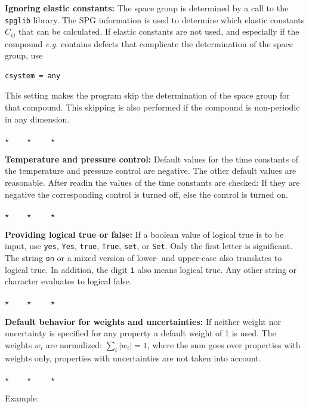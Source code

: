 \documentclass[a4paper,12pt,pdftex,onecolumn]{article}
\newcommand{\eg}{\emph{e.g.}\xspace}
\newcommand{\stars}{\begin{center}%
\vspace{1em plus 0.5em minus 0.5em}%
$\star \qquad \star \qquad \star$%
\vspace{1em plus 0.5em minus 0.5em}%
\end{center}}
\begin{document}
\textbf{Ignoring elastic constants:}
The space group is determined by a call to the \verb+spglib+ library.
The SPG information is used to determine which elastic constants $C_{ij}$ that can be
calculated. If elastic constants are not used, and especially if the compound \eg
contains defects that complicate the determination of the space group, use

\begin{Verbatim}[fontsize=\relsize{-1},frame=single]
csystem = any
\end{Verbatim}

This setting makes the program skip the determination of the space group for that
compound. This skipping is also performed if the compound is non-periodic in any
dimension.


\stars

\textbf{Temperature and pressure control:}
Default values for the time constants of the temperature and pressure control are negative.
The other default values are reasonable.
After readin the values of the time constants are checked: If they are negative the
corresponding control is turned off, else the control is turned on.


\stars

\textbf{Providing logical true or false:}
If a boolean value of logical true is to be input, use
\verb+yes+, \verb+Yes+, \verb+true+, \verb+True+, \verb+set+, or \verb+Set+.
Only the first letter is significant. The string \verb+on+
or a mixed version of lower- and upper-case also translates to logical true.
In addition, the digit \verb+1+ also means logical true.
Any other string or character evaluates to logical false.

\stars

\textbf{Default behavior for weights and uncertainties:}
If neither weight nor uncertainty is specified for any property a default weight of 1
is used. The weights $w_i$ are normalized: $\sum_i |w_i| = 1$, where the sum goes over
properties with weights only, properties with uncertainties are not taken into account.


\stars

Example:
\end{document}
